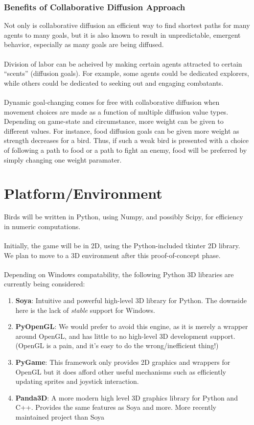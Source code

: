 \documentclass{article}
\begin{document}
\subsubsection*{Benefits of Collaborative Diffusion Approach}
Not only is collaborative diffusion an efficient way to find shortest paths for many agents to many goals, but it is also known to result in unpredictable, emergent behavior, especially as many goals are being diffused.
\\\\
Division of labor can be acheived by making certain agents attracted to certain ``scents'' (diffusion goals).  For example, some agents could be dedicated explorers, while others could be dedicated to seeking out and engaging combatants.
\\\\
Dynamic goal-changing comes for free with collaborative diffusion when movement choices are made as a function of multiple diffusion value types.  Depending on game-state and circumstance, more weight can be given to different values.  For instance, food diffusion goals can be given more weight as strength decreases for a bird.  Thus, if such a weak bird is presented with a choice of following a path to food or a path to fight an enemy, food will be preferred by simply changing one weight paramater.

\section*{Platform/Environment}
Birds will be written in Python, using Numpy, and possibly Scipy, for efficiency in numeric computations.
\\\\
Initially, the game will be in 2D, using the Python-included tkinter 2D library.  We plan to move to a 3D environment after this proof-of-concept phase.\\\\
Depending on Windows compatability, the following Python 3D libraries are currently being considered:\\
\begin{enumerate}
\item \textbf{Soya}: Intuitive and powerful high-level 3D library for Python.  The downside here is the lack of \textit{stable} support for Windows.\\
\item \textbf{PyOpenGL}: We would prefer to avoid this engine, as it is merely a wrapper around OpenGL, and has little to no high-level 3D development support. (OpenGL is a pain, and it's easy to do the wrong/inefficient thing!)\\
\item \textbf{PyGame}: This framework only provides 2D graphics and wrappers for OpenGL but it does afford other useful mechanisms such as efficiently updating sprites and joystick interaction.
\item \textbf{Panda3D}: A more modern high level 3D graphics library for Python and C++.  Provides the same features as Soya and more.  More recently maintained project than Soya\\
\end{enumerate}
\end{document}
